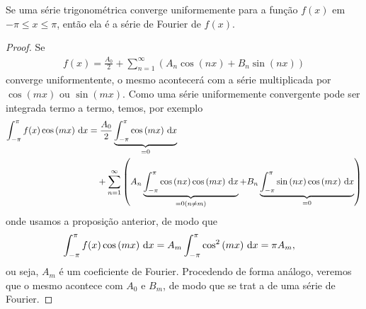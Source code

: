 \begin{teo}
    Se uma s\'{e}rie trigonom\'{e}trica converge uniformemente para a fun\c{c}\~{a}o $f(x)$ em $-\pi \leq x \leq \pi$, ent\~{a}o ela \'{e} a s\'{e}rie de Fourier de $f(x)$.
\end{teo}
\begin{proof}
    Se
    \begin{align*}
        f(x) = \frac{A_0}{2} + \sum_{n = 1}^\infty \left( A_n \cos\left( n x \right) + B_n \sin\left( n x \right) \right)
    \end{align*}
    converge uniformentente, o mesmo acontecer\'{a} com a s\'{e}rie multiplicada por $\cos\left( m x \right)$ ou $\sin\left( m x \right)$. Como uma s\'{e}rie uniformemente convergente pode ser integrada termo a termo, temos, por exemplo
    \begin{align*}
        \begin{split}
            \int_{-\pi}^\pi f(x) \cos\left( m x \right) \, \mathrm{d}x &= \frac{A_0}{2} \underbrace{\int_{-\pi}^\pi \cos\left( m x \right) \, \mathrm{d}x}_{= 0} \\
            &\quad {}+ \sum_{n = 1}^\infty \left( A_n \underbrace{\int_{-\pi}^\pi \cos\left( n x \right) \cos\left( m x \right) \, \mathrm{d}x}_{= 0 (n \neq m)} + B_n \underbrace{\int_{-\pi}^\pi \sin\left( n x \right) \cos\left( m x \right) \, \mathrm{d}x}_{= 0} \right)
        \end{split}
    \end{align*}
    onde usamos a proposi\c{c}\~{a}o anterior, de modo que
    \begin{align*}
        \int_{-\pi}^\pi f(x) \cos\left( m x \right) \, \mathrm{d}x &= A_m \int_{-\pi}^\pi \cos^2\left( m x \right) \, \mathrm{d}x = \pi A_m,
    \end{align*}
    ou seja, $A_m$ \'{e} um coeficiente de Fourier. Procedendo de forma an\'{a}logo, veremos que o mesmo acontece com $A_0$ e $B_m$, de modo que se trat a de uma s\'{e}rie de Fourier.
\end{proof}

